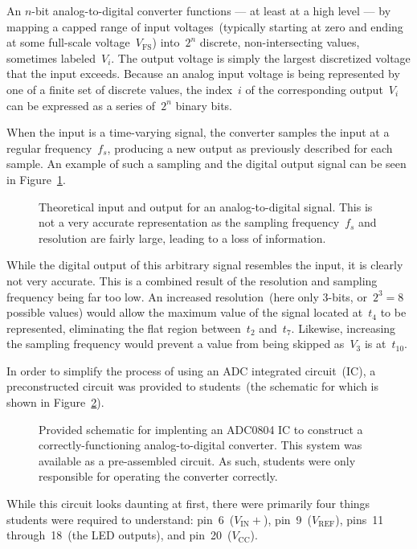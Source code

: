 An $n$-bit analog-to-digital converter functions --- at least at a high level --- by mapping a capped range of input voltages~(typically starting at zero and ending at some full-scale voltage~$V_\text{FS}$) into~$2^n$ discrete, non-intersecting values, sometimes labeled~$V_i$.  The output voltage is simply the largest discretized voltage that the input exceeds.  Because an analog input voltage is being represented by one of a finite set of discrete values, the index~$i$ of the corresponding output~$V_i$ can be expressed as a series of~$2^n$ binary bits.

When the input is a time-varying signal, the converter samples the input at a regular frequency~$f_s$, producing a new output as previously described for each sample.  An example of such a sampling and the digital output signal can be seen in Figure~\ref{fig:theory}.
%
\begin{figure}[H]
	\centering

	\parbox{.8\textwidth}{
	\caption[Theory Plots]{Theoretical input and output for an analog-to-digital signal.  This is not a very accurate representation as the sampling frequency~$f_s$ and resolution are fairly large, leading to a loss of information.}
	\label{fig:theory}}
\end{figure}
%
While the digital output of this arbitrary signal resembles the input, it is clearly not very accurate.  This is a combined result of the resolution and sampling frequency being far too low.  An increased resolution~(here only 3-bits, or~$2^3 = 8$ possible values) would allow the maximum value of the signal located at~$t_4$ to be represented, eliminating the flat region between~$t_2$ and~$t_7$.  Likewise, increasing the sampling frequency would prevent a value from being skipped as~$V_3$ is at~$t_{10}$.

In order to simplify the process of using an ADC integrated circuit~(IC), a preconstructed circuit was provided to students~(the schematic for which is shown in Figure~\ref{fig:adcSchem}).
%
\begin{figure}[H]
	\centering
	
	\parbox{.8\textwidth}{
	\caption[ADC Schematic]{Provided schematic for implenting an ADC0804 IC to construct a correctly-functioning analog-to-digital converter.  This system was available as a pre-assembled circuit.  As such, students were only responsible for operating the converter correctly.}
	\label{fig:adcSchem}}
\end{figure}
%
While this circuit looks daunting at first, there were primarily four things students were required to understand:  pin~6~($V_\text{IN}+$), pin~9~($V_\text{REF}$), pins~11 through~18~(the LED outputs), and pin~20~($V_\text{CC}$).

